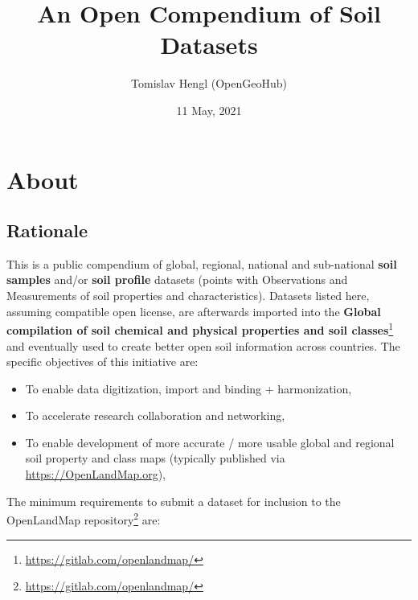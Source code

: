 \documentclass[
  graybox,natbib,nospthms]{svmono}
\title{An Open Compendium of Soil Datasets}
\author{Tomislav Hengl (OpenGeoHub)}
\date{11 May, 2021}
\providecommand{\tightlist}{%
  \setlength{\itemsep}{0pt}\setlength{\parskip}{0pt}}
\providecommand{\tightlist}{\setlength{\itemsep}{0pt}\setlength{\parskip}{0pt}}
\renewcommand{\href}[2]{#2 (\url{#1})}
\renewcommand{\href}[2]{#2\footnote{\url{#1}}}
\begin{document}
\maketitle

\thispagestyle{empty}
\begin{center}
\end{center}

\setlength{\abovedisplayskip}{-5pt}
\setlength{\abovedisplayshortskip}{-5pt}

{
\hypersetup{linkcolor=}
\setcounter{tocdepth}{1}
\tableofcontents
}
\hypertarget{about}{%
\chapter{About}\label{about}}

\hypertarget{rationale}{%
\section{Rationale}\label{rationale}}

This is a public compendium of global, regional, national and
sub-national \textbf{soil samples} and/or \textbf{soil profile} datasets (points with
Observations and Measurements of soil properties and characteristics).
Datasets listed here, assuming compatible open license, are afterwards
imported into the \href{https://gitlab.com/openlandmap/}{\textbf{Global compilation of soil chemical and physical
properties and soil classes}} and
eventually used to create better open soil information across countries.
The specific objectives of this initiative are:

\begin{itemize}
\tightlist
\item
  To enable data digitization, import and binding + harmonization,\\
\item
  To accelerate research collaboration and networking,\\
\item
  To enable development of more accurate / more usable global and
  regional soil property and class maps (typically published via
  \url{https://OpenLandMap.org}),
\end{itemize}

The minimum requirements to submit a dataset for inclusion to \href{https://gitlab.com/openlandmap/}{the
OpenLandMap repository} are:
\end{document}
